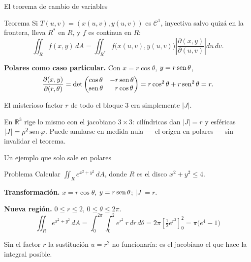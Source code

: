 \documentclass[11pt,aspectratio=169]{beamer}
\begin{document}
\begin{frame}{El teorema de cambio de variables}
  \begin{block}{Teorema}
    Si $T(u,v)=(x(u,v),y(u,v))$ es $\mathcal C^1$, inyectiva salvo quizá en la frontera, lleva $R^*$ en $R$, y $f$ es continua en $R$:
    {\small\[
      \iint_R f(x,y)\,dA
      = \iint_{R^*} f\bigl(x(u,v),y(u,v)\bigr)
        \left|\frac{\partial(x,y)}{\partial(u,v)}\right| du\,dv.
    \]}
  \end{block}
  \pause
  \textbf{Polares como caso particular.} Con $x=r\cos\theta$, $y=r\operatorname{sen}\theta$,
  \[
    \frac{\partial(x,y)}{\partial(r,\theta)}
    = \det\begin{pmatrix}
        \cos\theta & -r\operatorname{sen}\theta\\
        \operatorname{sen}\theta & \ \ r\cos\theta
      \end{pmatrix}
    = r\cos^2\theta + r\operatorname{sen}^2\theta = r.
  \]
  \pause
  \begin{center}\normalsize\color{tealx} El misterioso factor $r$ de todo el bloque 3 era simplemente $|J|$.\end{center}
  \pause
  \begin{center}\small\color{gray60} En $\mathbb R^3$ rige lo mismo con el jacobiano $3\times3$: cilíndricas dan $|J|=r$ y esféricas $|J|=\rho^2\operatorname{sen}\varphi$. Puede anularse en medida nula --- el origen en polares --- sin invalidar el teorema.\end{center}
\end{frame}

\begin{frame}{Un ejemplo que solo sale en polares}
  \begin{block}{Problema}
    Calcular $\displaystyle\iint_R e^{x^2+y^2}\,dA$, donde $R$ es el disco $x^2+y^2\le4$.
  \end{block}
  \pause
  \textbf{Transformación.} $x=r\cos\theta$, $y=r\operatorname{sen}\theta$; \quad $|J|=r$.
  \pause

  \textbf{Nueva región.} $0\le r\le2$, $0\le\theta\le2\pi$.
  \pause
  \[
    \iint_R e^{x^2+y^2}\,dA
    = \int_0^{2\pi}\!\!\int_0^2 e^{r^2}\ r\,dr\,d\theta
    = 2\pi\left[\tfrac12 e^{r^2}\right]_0^2
    = \boxed{\pi\bigl(e^4-1\bigr)}
  \]
  \pause
  \begin{center}\small\color{gray60}
  Sin el factor $r$ la sustitución $u=r^2$ no funcionaría: es el jacobiano el que hace la integral posible.
  \end{center}
\end{frame}
\end{document}
